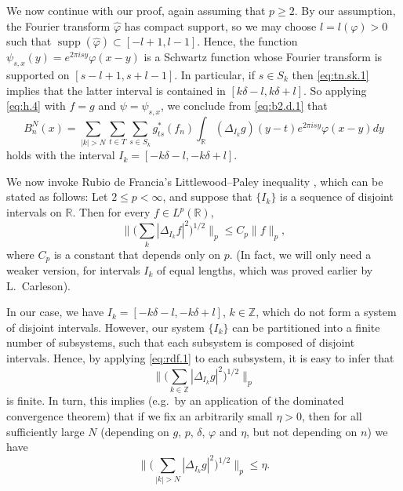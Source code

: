 \documentclass[reqno,a4paper,12pt]{amsart}
\numberwithin{equation}{section}
\numberwithin{figure}{section}
\newcommand\R{\mathbb{R}}
\newcommand\Z{\mathbb{Z}}
\newcommand\del{\delta}
\newcommand\Del{\Delta}
\newcommand\1{\mathds{1}}
\newcommand{\pphi}{\varphi}
\newcommand{\TTT}{T}
\newcommand{\SSS}{S}
\renewcommand\le{\leqslant}
\renewcommand\ge{\geqslant}
\newcommand\sbt{\subset}
\newcommand{\ft}[1]{\widehat{#1}}
\newcommand{\supp}{\operatorname{supp}}
\theoremstyle{plain}
\theoremstyle{definition}
\begin{document}
We now continue with our proof, again assuming that $p \ge 2$.
By our  assumption, the Fourier transform
 $\ft{\pphi}$ has compact support, so we may choose
$l = l (\pphi) > 0 $  such that $\supp( \ft{\pphi}) \sbt 
[- l +  1, l-1]$. Hence, the function $\psi_{s,x}(y) =  e^{2\pi i s y} \pphi(x-y)$
is a Schwartz function whose Fourier transform is supported
on $[s-l+1, s+l-1]$. In particular, if  $s \in \SSS_k$  then
\eqref{eq:tn.sk.1} implies that the latter
interval is contained in $ [k \del - l, k \del + l]$.
So  applying \eqref{eq:h.4} with $f = g$ and
$\psi = \psi_{s,x}$, we conclude from 
\eqref{eq:b2.d.1} that
\begin{equation}
\label{eq:b2.d.2}
B^N_n(x) = \sum_{|k| > N} \sum_{t\in \TTT} \sum_{s\in \SSS_k}
g_{ts}^*(f_n)  \int_\R  (\Del_{I_k} g ) (y-t) e^{2\pi i s y} \pphi(x-y) dy
\end{equation}
holds with the interval $I_k = [-k \del - l, -k \del + l]$.





We now invoke 
Rubio de Francia's Littlewood--Paley inequality \cite{Rub85},
which can be stated as follows: Let $2 \le p < \infty$,
and suppose that $\{I_k\}$ is a sequence of disjoint intervals on $\R$. 
Then for every $f \in L^p(\R)$, 
\begin{equation}
\label{eq:rdf.1}
\Big\| \Big(\sum_{k} 
|\Del_{I_k} f |^2 \Big)^{1/2} \Big\|_p \le C_p \|f\|_p,
\end{equation}
where $C_p$ is a constant that  depends only on $p$.
(In fact, we will only need a weaker version, for intervals $I_k$ of
equal lengths,  which was proved earlier by L.\ Carleson). 

In our case, we have
$I_k = [-k \del - l, -k \del + l]$, $k \in \Z$, 
which do not form a system of
disjoint intervals. However,
our system $\{I_k\}$ can be partitioned into a finite number
of subsystems, such that each subsystem is composed of disjoint intervals.
Hence, by applying \eqref{eq:rdf.1} to each subsystem, 
 it is easy to infer that 
\begin{equation}
\label{eq:rdf.5}
\Big\| \Big(\sum_{k \in\Z} | \Del_{I_k} g|^2\Big)^{1/2} \Big\|_p 
\end{equation}
is finite. In turn, this implies
(e.g.\ by an application of the dominated convergence theorem)
 that  if we fix an arbitrarily small 
 $\eta> 0 $, then for all sufficiently large $N$ (depending on 
 $g$, $p$, $\del$, $\pphi$ and $\eta$,
but not depending on $n$) we have
\begin{equation}
\label{eq:6.56}
\Big\| \Big(\sum_{|k| > N} | \Del_{I_k}  g |^2\Big)^{1/2} \Big\|_p   \le \eta.
\end{equation}
\end{document}
